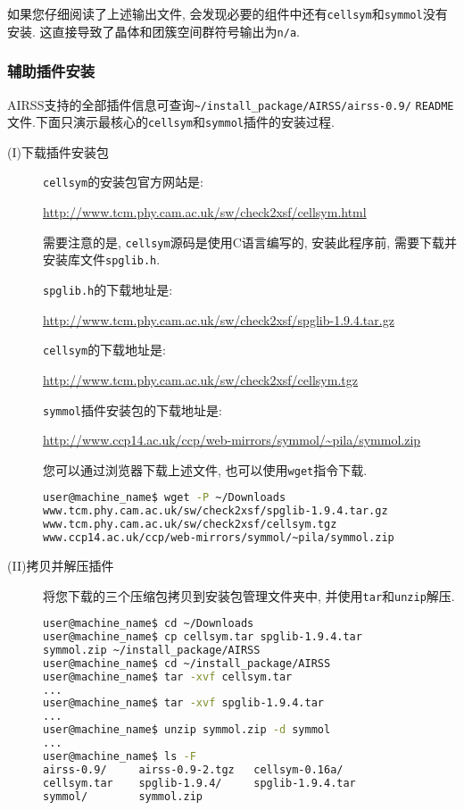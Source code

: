 \documentclass[a4paper, 10pt]{article}
\begin{document}
      如果您仔细阅读了上述输出文件, 会发现必要的组件中还有\verb|cellsym|和\verb|symmol|没有安装. 这直接导致了晶体和团簇空间群符号输出为\verb|n/a|. 
      \subsubsection{辅助插件安装}
      AIRSS支持的全部插件信息可查询\verb|~/install_package/AIRSS/airss-0.9/|
      \verb|README|文件.下面只演示最核心的\verb|cellsym|和\verb|symmol|插件的安装过程.
      \begin{description}
        \item[(I)下载插件安装包]
        \verb|cellsym|的安装包官方网站是:
        
        \url{http://www.tcm.phy.cam.ac.uk/sw/check2xsf/cellsym.html}

        需要注意的是, \verb|cellsym|源码是使用C语言编写的, 安装此程序前, 需要下载并安装库文件\verb|spglib.h|.

        \verb|spglib.h|的下载地址是:
        
        \url{http://www.tcm.phy.cam.ac.uk/sw/check2xsf/spglib-1.9.4.tar.gz}

        \verb|cellsym|的下载地址是:
        
        \url{http://www.tcm.phy.cam.ac.uk/sw/check2xsf/cellsym.tgz}

        \verb|symmol|插件安装包的下载地址是:
        
        \url{http://www.ccp14.ac.uk/ccp/web-mirrors/symmol/~pila/symmol.zip}

        您可以通过浏览器下载上述文件, 也可以使用\verb|wget|指令下载.
        \begin{lstlisting}[language={bash}]
user@machine_name$ wget -P ~/Downloads 
www.tcm.phy.cam.ac.uk/sw/check2xsf/spglib-1.9.4.tar.gz 
www.tcm.phy.cam.ac.uk/sw/check2xsf/cellsym.tgz 
www.ccp14.ac.uk/ccp/web-mirrors/symmol/~pila/symmol.zip
        \end{lstlisting}

        \item[(II)拷贝并解压插件]将您下载的三个压缩包拷贝到安装包管理文件夹中, 并使用\verb|tar|和\verb|unzip|解压.
        \begin{lstlisting}[language={bash}]
user@machine_name$ cd ~/Downloads
user@machine_name$ cp cellsym.tar spglib-1.9.4.tar 
symmol.zip ~/install_package/AIRSS
user@machine_name$ cd ~/install_package/AIRSS
user@machine_name$ tar -xvf cellsym.tar
...
user@machine_name$ tar -xvf spglib-1.9.4.tar
...
user@machine_name$ unzip symmol.zip -d symmol
...
user@machine_name$ ls -F
airss-0.9/     airss-0.9-2.tgz   cellsym-0.16a/  
cellsym.tar    spglib-1.9.4/     spglib-1.9.4.tar  
symmol/        symmol.zip
        \end{lstlisting}
        

\end{description}
\end{document}
